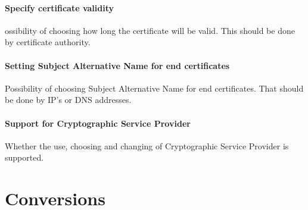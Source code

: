 \documentclass[10pt, a4paper]{report}
\begin{document}
\paragraph{Specify certificate validity}
{ossibility of choosing how long the certificate will be valid. This should be done by certificate authority.

\paragraph{Setting Subject Alternative Name for end certificates}
Possibility of choosing Subject Alternative Name for end certificates. That should be done by IP's or DNS addresses.

\paragraph{Support for Cryptographic Service Provider}
Whether the use, choosing and changing of Cryptographic Service Provider is supported.


\section{Conversions}

}
\end{document}
